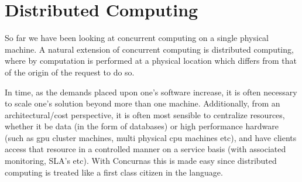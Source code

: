\documentclass[conc-doc]{subfiles}
\begin{document}
	
	\chapter[Distributed Computing]{Distributed Computing}
	\label{ch:distComp}


So far we have been looking at concurrent computing on a single physical machine. A natural extension of concurrent computing is distributed computing, where by computation is performed at a physical location which differs from that of the origin of the request to do so.

In time, as the demands placed upon one's software increase, it is often necessary to scale one's solution beyond more than one machine. Additionally, from an architectural/cost perspective, it is often most sensible to centralize resources, whether it be data (in the form of databases) or high performance hardware (such as gpu cluster machines, multi physical cpu machines etc), and have clients access that resource in a controlled manner on a service basis (with associated monitoring, SLA's etc). With Concurnas this is made easy since distributed computing is treated like a first class citizen in the language.

\end{document}
